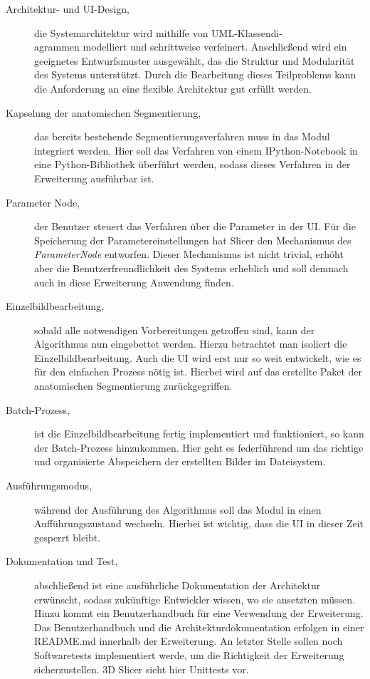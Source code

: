 \begin{description}
	\item[Architektur- und \ac{UI}-Design,] die Systemarchitektur wird mithilfe von
		\ac{UML}-Klassendi-\\agrammen modelliert und schrittweise verfeinert.
		Anschließend wird ein geeignetes Entwurfsmuster ausgewählt, das die Struktur
		und Modularität des Systems unterstützt. Durch die Bearbeitung dieses
		Teilproblems kann die Anforderung an eine flexible Architektur gut erfüllt
		werden.

	\item[Kapselung der anatomischen Segmentierung,] das bereits bestehende Segmentierungsverfahren
		muss in das Modul integriert werden. Hier soll das Verfahren von einem
		IPython-Notebook in eine Python-Bibliothek überführt werden, sodass dieses Verfahren
		in der Erweiterung ausführbar ist.

	\item[Parameter Node,] der Benutzer steuert das Verfahren über die Parameter in
		der \ac{UI}. Für die Speicherung der Parametereinstellungen hat Slicer den Mechanismus
		des \textit{ParameterNode} entworfen. Dieser Mechanismus ist nicht trivial,
		erhöht aber die Benutzerfreundlichkeit des Systems erheblich und soll
		demnach auch in diese Erweiterung Anwendung finden.

	\item[Einzelbildbearbeitung,] sobald alle notwendigen Vorbereitungen getroffen
		sind, kann der Algorithmus nun eingebettet werden. Hierzu betrachtet man isoliert
		die Einzelbildbearbeitung. Auch die \ac{UI} wird erst nur so weit entwickelt,
		wie es für den einfachen Prozess nötig ist. Hierbei wird auf das erstellte Paket
		der anatomischen Segmentierung zurückgegriffen.

	\item[Batch-Prozess,] ist die Einzelbildbearbeitung fertig implementiert und funktioniert,
		so kann der Batch-Prozess hinzukommen. Hier geht es federführend um das richtige
		und organisierte Abspeichern der erstellten Bilder im Dateisystem.

	\item[Ausführungsmodus,] während der Ausführung des Algorithmus soll das Modul
		in einen Aufführungszustand wechseln. Hierbei ist wichtig, dass die \ac{UI}
		in dieser Zeit gesperrt bleibt.

	\item[Dokumentation und Test,] abschließend ist eine ausführliche Dokumentation
		der Architektur erwünscht, sodass zukünftige Entwickler wissen, wo sie ansetzten
		müssen. Hinzu kommt ein Benutzerhandbuch für eine Verwendung der Erweiterung.
		Das Benutzerhandbuch und die Architekturdokumentation erfolgen in einer README.md
		innerhalb der Erweiterung. An letzter Stelle sollen noch Softwaretests
		implementiert werde, um die Richtigkeit der Erweiterung sicherzustellen. 3D
		Slicer sieht hier Unittests vor.
\end{description}

